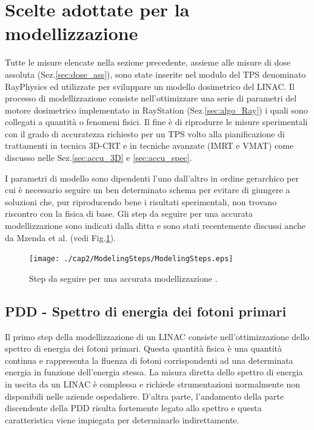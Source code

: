 \section{Scelte adottate per la modellizzazione}
Tutte le misure elencate nella sezione precedente, assieme alle misure di dose assoluta (Sez.\ref{sec:dose_ass}), sono state inserite nel modulo del TPS denominato RayPhysics ed utilizzate per sviluppare un modello dosimetrico del LINAC. Il processo di modellizzazione consiste nell'ottimizzare una serie di parametri del motore dosimetrico implementato in RayStation (Sez.\ref{sec:algo_Ray}) i quali sono collegati a quantità o fenomeni fisici. Il fine è di riprodurre le misure sperimentali con il grado di accuratezza richiesto per un TPS volto alla pianificazione di trattamenti in tecnica 3D-CRT e in tecniche avanzate (IMRT e VMAT) come discusso nelle Sez.\ref{sec:accu_3D} e \ref{sec:accu_spec}.

I parametri di modello sono dipendenti l'uno dall'altro in ordine gerarchico per cui è necessario seguire un ben determinato schema per evitare di giungere a soluzioni che, pur riproducendo bene i risultati sperimentali, non trovano riscontro con la fisica di base. Gli step da seguire per una accurata modellizzazione sono indicati dalla ditta \cite{RaySearchLaboratories2014} e sono stati recentemente discussi anche da Mzenda et al.\cite{Mzenda2014} (vedi Fig.\ref{fig:modeling_steps}).
\begin{figure}
\centering
\texttt{[image: ./cap2/ModelingSteps/ModelingSteps.eps]}
\caption{Step da seguire per una accurata modellizzazione \cite{Mzenda2014}.}
\label{fig:modeling_steps}
\end{figure}

\subsection{PDD - Spettro di energia dei fotoni primari}
Il primo step della modellizzazione di un LINAC consiste nell'ottimizzazione dello spettro di energia dei fotoni primari. Questa quantità fisica è una quantità continua e rappresenta la fluenza di fotoni corrispondenti ad una determinata energia in funzione dell'energia stessa. La misura diretta dello spettro di energia in uscita da un LINAC è complessa e richiede strumentazioni normalmente non disponibili nelle aziende ospedaliere. D'altra parte, l'andamento della parte discendente della PDD risulta fortemente legato allo spettro \cite{Khan2010} e questa caratteristica viene impiegata per determinarlo indirettamente.

